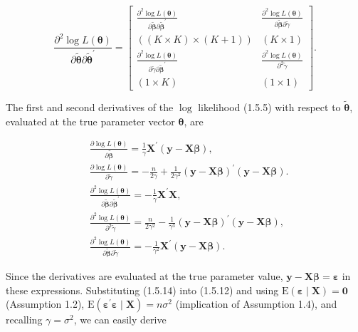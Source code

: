 \documentclass[10pt]{article}
\begin{document}
\[
\frac{\partial^{2} \log L(\boldsymbol{\theta})}{\partial \tilde{\boldsymbol{\theta}} \partial \tilde{\boldsymbol{\theta}}^{\prime}}=\left[\begin{array}{cc}
\frac{\partial^{2} \log L(\boldsymbol{\theta})}{\partial \widetilde{\boldsymbol{\beta}} \partial \widetilde{\boldsymbol{\beta}}^{\prime}} & \frac{\partial^{2} \log L(\boldsymbol{\theta})}{\partial \widetilde{\boldsymbol{\beta}} \partial \tilde{\gamma}}  \tag{1.5.12}\\
((K \times K) \times(K+1)) & (K \times 1) \\
\frac{\partial^{2} \log L(\boldsymbol{\theta})}{\partial \tilde{\gamma} \partial \widetilde{\boldsymbol{\beta}}^{\prime}} & \frac{\partial^{2} \log L(\boldsymbol{\theta})}{\partial^{2} \tilde{\gamma}} \\
(1 \times K) & (1 \times 1)
\end{array}\right] .
\]

The first and second derivatives of the $\log$ likelihood (1.5.5) with respect to $\tilde{\boldsymbol{\theta}}$, evaluated at the true parameter vector $\boldsymbol{\theta}$, are


\begin{align*}
& \frac{\partial \log L(\boldsymbol{\theta})}{\partial \widetilde{\boldsymbol{\beta}}}=\frac{1}{\gamma} \mathbf{X}^{\prime}(\mathbf{y}-\mathbf{X} \boldsymbol{\beta}),  \tag{1.5.13a}\\
& \frac{\partial \log L(\boldsymbol{\theta})}{\partial \tilde{\gamma}}=-\frac{n}{2 \gamma}+\frac{1}{2 \gamma^{2}}(\mathbf{y}-\mathbf{X} \boldsymbol{\beta})^{\prime}(\mathbf{y}-\mathbf{X} \boldsymbol{\beta}) .  \tag{1.5.13b}\\
& \frac{\partial^{2} \log L(\boldsymbol{\theta})}{\partial \widetilde{\boldsymbol{\beta}} \partial \widetilde{\boldsymbol{\beta}}^{\prime}}=-\frac{1}{\gamma} \mathbf{X}^{\prime} \mathbf{X},  \tag{1.5.14a}\\
& \frac{\partial^{2} \log L(\boldsymbol{\theta})}{\partial^{2} \tilde{\gamma}}=\frac{n}{2 \gamma^{2}}-\frac{1}{\gamma^{3}}(\mathbf{y}-\mathbf{X} \boldsymbol{\beta})^{\prime}(\mathbf{y}-\mathbf{X} \boldsymbol{\beta}),  \tag{1.5.14b}\\
& \frac{\partial^{2} \log L(\boldsymbol{\theta})}{\partial \widetilde{\boldsymbol{\beta}} \partial \tilde{\gamma}}=-\frac{1}{\gamma^{2}} \mathbf{X}^{\prime}(\mathbf{y}-\mathbf{X} \boldsymbol{\beta}) . \tag{1.5.14c}
\end{align*}


Since the derivatives are evaluated at the true parameter value, $\mathbf{y}-\mathbf{X} \boldsymbol{\beta}=\boldsymbol{\varepsilon}$ in these expressions. Substituting (1.5.14) into (1.5.12) and using $\mathrm{E}(\boldsymbol{\varepsilon} \mid \mathbf{X})=\mathbf{0}$ (Assumption 1.2), $\mathrm{E}\left(\boldsymbol{\varepsilon}^{\prime} \boldsymbol{\varepsilon} \mid \mathbf{X}\right)=n \sigma^{2}$ (implication of Assumption 1.4), and recalling $\gamma=\sigma^{2}$, we can easily derive
\end{document}
